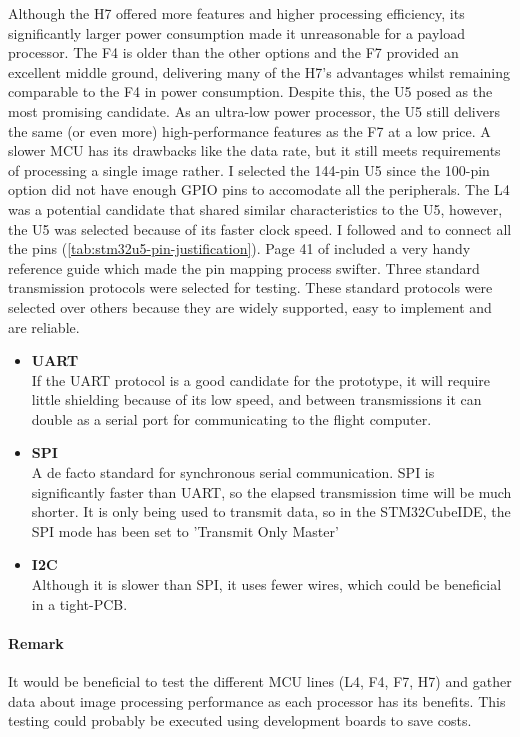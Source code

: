Although the H7 offered more features and higher processing efficiency, its significantly larger power consumption made it unreasonable for a payload processor.
The F4 is older than the other options and the F7 provided an excellent middle ground, delivering many of the H7's advantages whilst remaining comparable to the F4 in power consumption.
Despite this, the U5 posed as the most promising candidate. As an ultra-low power processor, the U5 still delivers the same (or even more) high-performance features as the F7 at a low price. A slower MCU has its drawbacks like the data rate, but it still meets requirements of processing a single image rather. I selected the 144-pin U5 since the 100-pin option did not have enough GPIO pins to accomodate all the peripherals. The L4 was a potential candidate that shared similar characteristics to the U5, however, the U5 was selected because of its faster clock speed.
\nl
I followed \cite{u5-getting-started} and \cite{u5-datasheet} to connect all the pins (\autoref{tab:stm32u5-pin-justification}). Page 41 of \cite{u5-datasheet} included a very handy reference guide which made the pin mapping process swifter.
\nl
Three standard transmission protocols were selected for testing. These standard protocols were selected over others because they are widely supported, easy to implement and are reliable.
\begin{itemize}
    \item \textbf{UART} \\
    If the UART protocol is a good candidate for the prototype, it will require little shielding because of its low speed, and between transmissions it can double as a serial port for communicating to the flight computer.

    \item \textbf{SPI} \\
    A de facto standard for synchronous serial communication. SPI is significantly faster than UART, so the elapsed transmission time will be much shorter.
    It is only being used to transmit data, so in the STM32CubeIDE, the SPI mode has been set to 'Transmit Only Master'

    \item \textbf{I2C} \\
    Although it is slower than SPI, it uses fewer wires, which could be beneficial in a tight-PCB.
\end{itemize}

\paragraph{Remark}
It would be beneficial to test the different MCU lines (L4, F4, F7, H7) and gather data about image processing performance as each processor has its benefits. This testing could probably be executed using development boards to save costs.